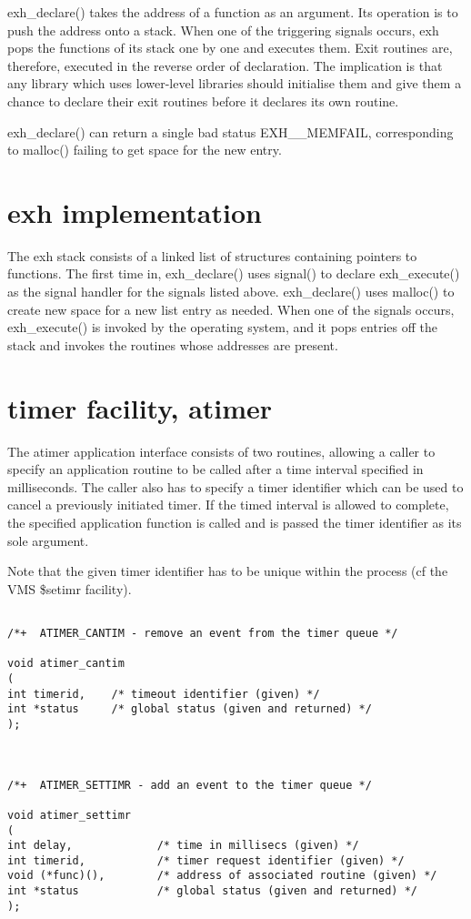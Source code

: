 exh\_declare() takes the address of a function as an argument. Its
operation is to push the address onto a stack. When one of the triggering
signals occurs, exh pops the functions of its stack one by one and
executes them. Exit routines are, therefore, executed in the reverse
order of declaration. The implication is that any library which uses
lower-level libraries should initialise them and give them a chance to
declare their exit routines before it declares its own routine.

exh\_declare() can return a single bad status EXH\_\_MEMFAIL, corresponding
to malloc() failing to get space for the new entry.

\section {exh implementation}

The exh stack consists of a linked list of structures containing pointers
to functions. The first time in, exh\_declare() uses signal() to declare
exh\_execute() as the signal handler for the signals listed above.
exh\_declare() uses malloc() to create new space for a new list entry as
needed. When one of the signals occurs, exh\_execute() is invoked by the
operating system, and it pops entries off the stack and invokes the
routines whose addresses are present.

\section {timer facility, atimer}

The atimer application interface consists of two routines, allowing a
caller to specify an application routine to be called after a time
interval specified in milliseconds. The caller also has to specify a
timer identifier which can be used to cancel a previously initiated
timer. If the timed interval is allowed to complete, the specified
application function is called and is passed the timer identifier as its
sole argument.

Note that the given timer identifier has to be unique within the process
(cf the VMS \$setimr facility).


\begin{verbatim}

/*+  ATIMER_CANTIM - remove an event from the timer queue */

void atimer_cantim
(
int timerid,    /* timeout identifier (given) */
int *status     /* global status (given and returned) */
);



/*+  ATIMER_SETTIMR - add an event to the timer queue */

void atimer_settimr
(
int delay,             /* time in millisecs (given) */
int timerid,           /* timer request identifier (given) */
void (*func)(),        /* address of associated routine (given) */
int *status            /* global status (given and returned) */
);

\end{verbatim}


